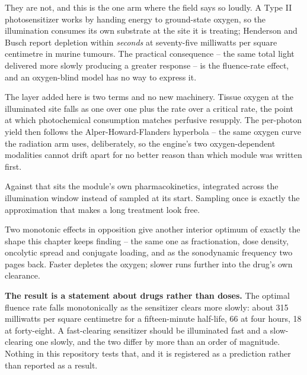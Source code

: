 \documentclass[11pt,twoside,openright]{report}
\begin{document}
They are not, and this is the one arm where the field says so loudly. A Type II photosensitizer works by handing energy to ground-state oxygen, so the illumination consumes its own substrate at the site it is treating; Henderson and Busch report depletion within \textit{seconds} at seventy-five milliwatts per square centimetre in murine tumours. The practical consequence -- the same total light delivered more slowly producing a greater response -- is the fluence-rate effect, and an oxygen-blind model has no way to express it.

\begin{numbers}
The layer added here is two terms and no new machinery. Tissue oxygen at the illuminated site falls as one over one plus the rate over a critical rate, the point at which photochemical consumption matches perfusive resupply. The per-photon yield then follows the Alper-Howard-Flanders hyperbola -- the same oxygen curve the radiation arm uses, deliberately, so the engine's two oxygen-dependent modalities cannot drift apart for no better reason than which module was written first.

Against that sits the module's own pharmacokinetics, integrated across the illumination window instead of sampled at its start. Sampling once is exactly the approximation that makes a long treatment look free.
\end{numbers}

\begin{finding}
Two monotonic effects in opposition give another interior optimum of exactly the shape this chapter keeps finding -- the same one as fractionation, dose density, oncolytic spread and conjugate loading, and as the sonodynamic frequency two pages back. Faster depletes the oxygen; slower runs further into the drug's own clearance.

\textbf{The result is a statement about drugs rather than doses.} The optimal fluence rate falls monotonically as the sensitizer clears more slowly: about 315 milliwatts per square centimetre for a fifteen-minute half-life, 66 at four hours, 18 at forty-eight. A fast-clearing sensitizer should be illuminated fast and a slow-clearing one slowly, and the two differ by more than an order of magnitude. Nothing in this repository tests that, and it is registered as a prediction rather than reported as a result.
\end{finding}
\end{document}
